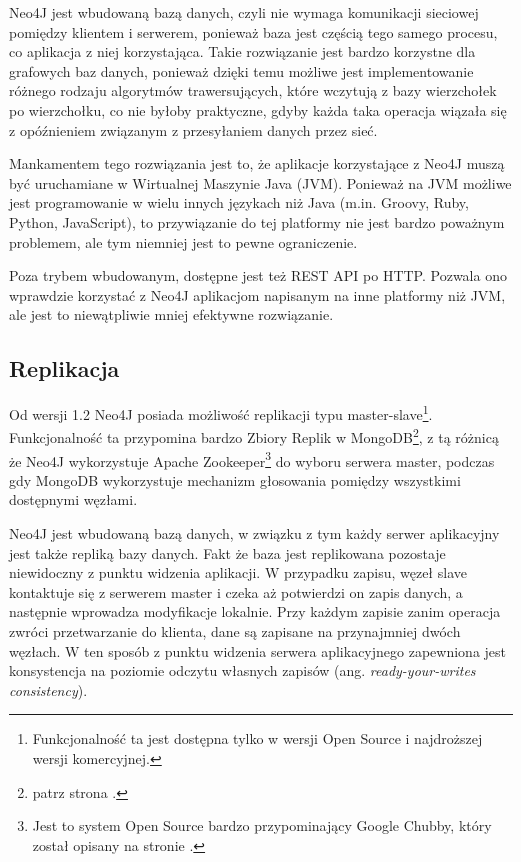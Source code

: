 Neo4J jest wbudowaną bazą danych, czyli nie wymaga komunikacji sieciowej pomiędzy klientem i serwerem, ponieważ baza jest częścią tego samego procesu, co aplikacja z niej korzystająca.
Takie rozwiązanie jest bardzo korzystne dla grafowych baz danych, ponieważ dzięki temu możliwe jest implementowanie różnego rodzaju algorytmów trawersujących, które wczytują z bazy wierzchołek po wierzchołku, co nie byłoby praktyczne, gdyby każda taka operacja wiązała się z opóźnieniem związanym z przesyłaniem danych przez sieć.

Mankamentem tego rozwiązania jest to, że aplikacje korzystające z Neo4J muszą być uruchamiane w Wirtualnej Maszynie Java (JVM).
Ponieważ na JVM możliwe jest programowanie w wielu innych językach niż Java (m.in. Groovy, Ruby, Python, JavaScript), to przywiązanie do tej platformy nie jest bardzo poważnym problemem, ale tym niemniej jest to pewne ograniczenie.

Poza trybem wbudowanym, dostępne jest też REST API po HTTP.
Pozwala ono wprawdzie korzystać z Neo4J aplikacjom napisanym na inne platformy niż JVM, ale jest to niewątpliwie mniej efektywne rozwiązanie.

\subsection*{Replikacja}


Od wersji 1.2 Neo4J posiada możliwość replikacji typu master-slave\footnote{Funkcjonalność ta jest dostępna tylko w wersji Open Source i najdroższej wersji komercyjnej.}.
Funkcjonalność ta przypomina bardzo Zbiory Replik w MongoDB\footnote{patrz strona \pageref{sec:mongodb-replication}.}, z tą różnicą że Neo4J wykorzystuje Apache Zookeeper\footnote{Jest to system Open Source bardzo przypominający Google Chubby, który został opisany na stronie \pageref{sec:google-chubby}.} do wyboru serwera master, podczas gdy MongoDB wykorzystuje mechanizm głosowania pomiędzy wszystkimi dostępnymi węzłami.

Neo4J jest wbudowaną bazą danych, w związku z tym każdy serwer aplikacyjny jest także repliką bazy danych.
Fakt że baza jest replikowana pozostaje niewidoczny z punktu widzenia aplikacji.
W przypadku zapisu, węzeł slave kontaktuje się z serwerem master i czeka aż potwierdzi on zapis danych, a następnie wprowadza modyfikacje lokalnie.
Przy każdym zapisie zanim operacja zwróci przetwarzanie do klienta, dane są zapisane na przynajmniej dwóch węzłach.
W ten sposób z punktu widzenia serwera aplikacyjnego zapewniona jest konsystencja na poziomie odczytu własnych zapisów (ang. \emph{ready-your-writes consistency}).

